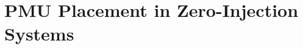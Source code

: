 \documentclass{umthesis}          %
\begin{document}




\appendix
\chapter{PMU Placement in Zero-Injection Systems}
\label{ch:appendix-pmu}




\backmatter  %




\end{document}
